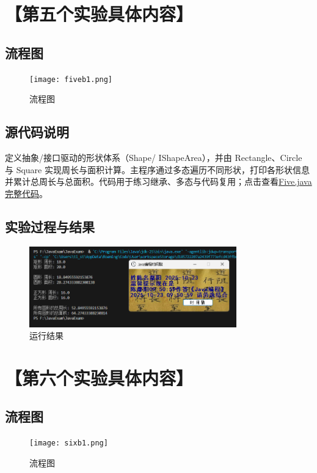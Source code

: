 \documentclass[12pt,a4paper]{article}
\begin{document}
\section*{【第五个实验具体内容】}
\subsection*{流程图}

\begin{figure}[H]
\centering
\texttt{[image: fiveb1.png]}
\caption{流程图}
\end{figure}

\subsection*{源代码说明}
定义抽象/接口驱动的形状体系（Shape/ IShapeArea），并由 Rectangle、Circle 与 Square 实现周长与面积计算。主程序通过多态遍历不同形状，打印各形状信息并累计总周长与总面积。代码用于练习继承、多态与代码复用；点击查看\hyperref[sec:five]{Five.java完整代码}。

\subsection*{实验过程与结果}

\begin{figure}[H]
\centering
\includegraphics[width=0.8\textwidth]{fiveb.png}
\caption{运行结果}
\end{figure}

\section*{【第六个实验具体内容】}
\subsection*{流程图}

\begin{figure}[H]
\centering
\texttt{[image: sixb1.png]}
\caption{流程图}
\end{figure}
\end{document}
